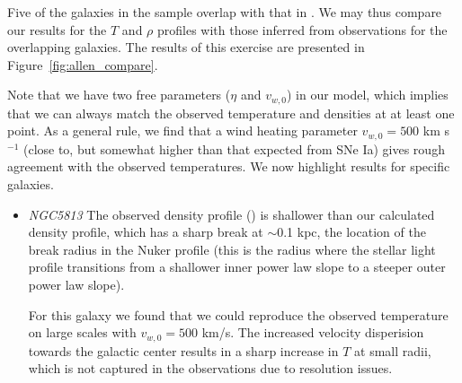 \documentclass[usenatbib,fleqn]{mn2e}
\newcommand{\vwO}{v_{w,0}}
\begin{document}
Five of the galaxies in the \citet{AllenDunn+:2006a} sample overlap with that in .  We may thus compare our results for the $T$ and $\rho$ profiles with those inferred from observations for the overlapping galaxies.  The results of this exercise are presented in Figure~\ref{fig:allen_compare}.

Note that we have two free parameters ($\eta$ and $\vwO$) in our model, which implies that we can always match the observed temperature and densities at at least one point.  As a general rule, we find that a wind heating parameter $\vwO=500$
km s$^{-1}$ (close to, but somewhat higher than that expected from SNe Ia) gives rough agreement with the observed temperatures.  We now highlight results for specific galaxies.

\begin{itemize}


\item \emph{NGC5813} %
  The observed density profile (\citealt{RussellMcNamara+:2013a}) is
  shallower than our calculated density profile, which has a sharp
  break at $\sim$0.1 kpc, the location of the break radius in the
  Nuker profile (this is the radius where the stellar light profile
  transitions from a shallower inner power law slope to a steeper
  outer power law slope).

  For this galaxy we found that we could reproduce the observed
  temperature on large scales with $\vwO=500$ km/s. The increased
  velocity disperision towards the galactic center results in a sharp
  increase in $T$ at small radii, which is not captured in the
  observations due to resolution issues.
\end{itemize}
\end{document}
